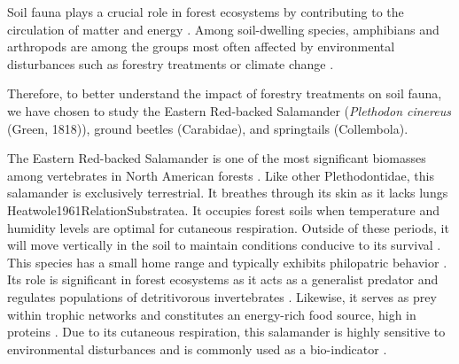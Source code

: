 Soil fauna plays a crucial role in forest ecosystems by contributing to the circulation of matter and energy \citep{Kudrin2023metaanalysiseffects,Seibold2021contributioninsects}. 
Among soil-dwelling species, amphibians and arthropods are among the groups most often affected by environmental disturbances such as forestry treatments \citep{Hartshorn2021reviewforest,Semlitsch2009Effectstimber,Stuart2004Statustrends} or climate change \citep{Alford1999Globalamphibian,Houlahan2000Quantitativeevidence,Milanovich2010Projectedloss,Parmesan2006EcologicalEvolutionary,Pounds2006Widespreadamphibian,Warren2018projectedeffect}.

Therefore, to better understand the impact of forestry treatments on soil fauna, we have chosen to study the Eastern Red-backed Salamander (\textit{Plethodon cinereus} (Green, 1818)), ground beetles (Carabidae), and springtails (Collembola).

The Eastern Red-backed Salamander is one of the most significant biomasses among vertebrates in North American forests \citep{Burton1975Salamanderpopulations,Petranka1993Effectstimber,semlitschAbundanceBiomassProduction2014a}. 
Like other Plethodontidae, this salamander is exclusively terrestrial. It breathes through its skin as it lacks lungs {Heatwole1961RelationSubstratea}. 
It occupies forest soils when temperature and humidity levels are optimal for cutaneous respiration. 
Outside of these periods, it will move vertically in the soil to maintain conditions conducive to its survival \citep{Grizzell1949HibernationSite}. 
This species has a small home range and typically exhibits philopatric behavior \citep{Yurewicz2004ResourceAvailability}. 
Its role is significant in forest ecosystems as it acts as a generalist predator and regulates populations of detritivorous invertebrates \citep{Burton1975Energyflow,Hickerson2017Easternredbacked,Walton2013Topdownregulation}. 
Likewise, it serves as prey within trophic networks and constitutes an energy-rich food source, high in proteins \citep{Burton1975Energyflow,Pough1987abundancesalamanders}. 
Due to its cutaneous respiration, this salamander is highly sensitive to environmental disturbances \citep{Welsh2001caseusing} and is commonly used as a bio-indicator \citep{Baecher2018Environmentalgradients,gibbsDistributionWoodlandAmphibians1998,Heatwole1962EnvironmentalFactors,Harpole1999Effectsseven,Hocking2013Effectsexperimental,Mazerolle2021Woodlandsalamander}.

